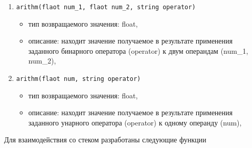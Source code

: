 \begin{enumerate}
	\item \texttt{arithm(flaot num\_1, flaot num\_2, string operator)}
	\begin{itemize}
		\item тип возвращаемого значения: float,
		\item описание: находит значение получаемое в результате применения заданного бинарного оператора (operator) к двум операндам (num\_1, num\_2),
	\end{itemize}
	\newpage
	
	\item \texttt{arithm(flaot num, string operator)}
	\begin{itemize}
		\item тип возвращаемого значения: float,
		\item описание: находит значение получаемое в результате применения заданного унарного оператора (operator) к одному операнду (num),
	\end{itemize}
\end{enumerate}
Для взаимодействия со стеком разработаны следующие функции
